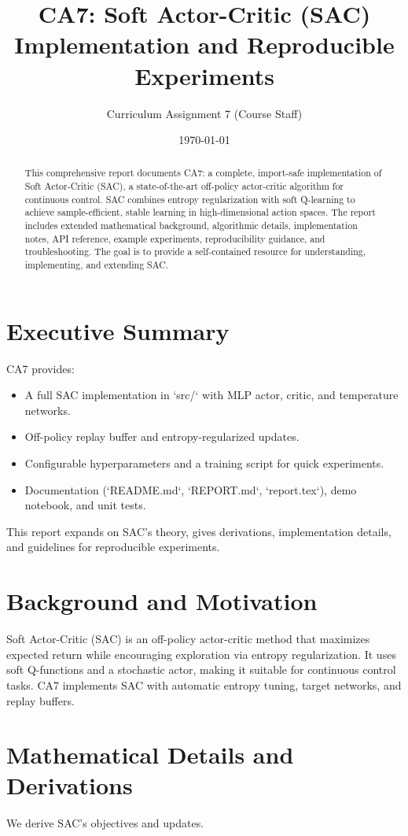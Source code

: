 \documentclass[11pt,a4paper]{article}
\title{CA7: Soft Actor-Critic (SAC) Implementation and Reproducible Experiments}
\author[1]{Curriculum Assignment 7 (Course Staff)}
\affil[1]{Department / Course}
\date{\today}
\begin{document}
\maketitle
\begin{abstract}
This comprehensive report documents CA7: a complete, import-safe implementation of Soft Actor-Critic (SAC), a state-of-the-art off-policy actor-critic algorithm for continuous control. SAC combines entropy regularization with soft Q-learning to achieve sample-efficient, stable learning in high-dimensional action spaces. The report includes extended mathematical background, algorithmic details, implementation notes, API reference, example experiments, reproducibility guidance, and troubleshooting. The goal is to provide a self-contained resource for understanding, implementing, and extending SAC.
\end{abstract}

\tableofcontents
\newpage

\section{Executive Summary}
CA7 provides:
\begin{itemize}
  \item A full SAC implementation in `src/` with MLP actor, critic, and temperature networks.
  \item Off-policy replay buffer and entropy-regularized updates.
  \item Configurable hyperparameters and a training script for quick experiments.
  \item Documentation (`README.md`, `REPORT.md`, `report.tex`), demo notebook, and unit tests.
\end{itemize}
This report expands on SAC's theory, gives derivations, implementation details, and guidelines for reproducible experiments.

\section{Background and Motivation}
Soft Actor-Critic (SAC) \cite{haarnoja2018soft} is an off-policy actor-critic method that maximizes expected return while encouraging exploration via entropy regularization. It uses soft Q-functions and a stochastic actor, making it suitable for continuous control tasks. CA7 implements SAC with automatic entropy tuning, target networks, and replay buffers.

\section{Mathematical Details and Derivations}
We derive SAC's objectives and updates.
\end{document}

